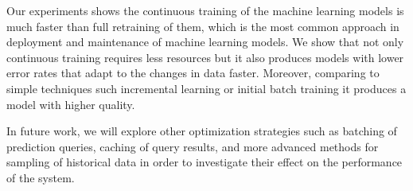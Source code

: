 \documentclass{vldb}
\begin{document}
Our experiments shows the continuous training of the machine learning models is much faster than full retraining of them, which is the most common approach in deployment and maintenance of machine learning models. 
We show that not only continuous training requires less resources but it also produces models with lower error rates that adapt to the changes in data faster.
Moreover, comparing to simple techniques such incremental learning or initial batch training it produces a model with higher quality.

In future work, we will explore other optimization strategies such as batching of prediction queries, caching of query results, and more advanced methods for sampling of historical data in order to investigate their effect on the performance of the system.

{\footnotesize}
\end{document}
